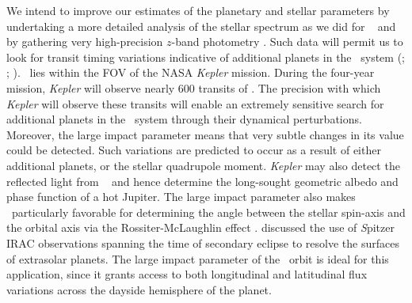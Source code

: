We intend to improve our estimates of the planetary and stellar
parameters by undertaking a more detailed analysis of the stellar
spectrum as we did for \tresOne\
\citep{Sozzetti_Yong_Torres:apjl:2004a} and by gathering very
high-precision $z$-band photometry
\citep[e.g.,][]{Holman_Winn_Latham:apj:2006a}.  Such data will
permit us to look for transit timing variations indicative of
additional planets in the \tresTwo\ system
(\citealp{Agol_Steffen_Sari:mnras:2005a}; \citealp{Holman_Murray:Science:2005a}; \citealp{Steffen_Agol:mnras:2005a}). \tresTwo\ lies within the FOV of the NASA
\textit{Kepler} mission. During the four-year mission,
\textit{Kepler} will observe nearly 600 transits of \tresTwo.
The precision with which \textit{Kepler} will observe these transits will
enable an extremely sensitive search for additional planets in the \tresTwo\
system through their dynamical perturbations.  Moreover, the large impact
parameter means that very subtle changes in its value could be detected.
Such variations are predicted \citep{Miralda-Escude:apj:2002a} to occur as a result
of either additional planets, or the stellar quadrupole moment. \textit{Kepler}
may also detect the reflected light from \tresTwo\ \citep{Jenkins_Doyle:apj:2003a}
and hence determine the long-sought geometric albedo and phase function of
a hot Jupiter.
The large impact parameter also makes \tresTwo\ particularly
favorable for determining the angle between the stellar spin-axis and the
orbital axis via the Rossiter-McLaughlin effect
\citep{Gaudi_Winn:apj:2007a}.
\citet{Williams_Charbonneau_Cooper:apj:2006a} discussed
the use of {\textit Spitzer} IRAC observations spanning the time of
secondary eclipse to resolve the surfaces of extrasolar planets.  The
large impact parameter of the \tresTwo\ orbit is ideal for this
application, since it grants access to both longitudinal and
latitudinal flux variations across the dayside hemisphere of the
planet.
